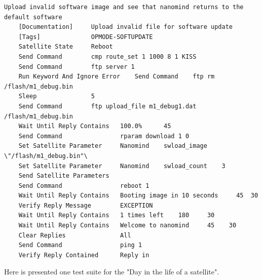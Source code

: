\documentclass[english,12pt,a4paper,pdftex,elec,utf8]{aaltothesis}
\begin{document}
\begin{verbatim}
Upload invalid software image and see that nanomind returns to the default software
	[Documentation]		Upload invalid file for software update
	[Tags]				OPMODE-SOFTUPDATE
	Satellite State 	Reboot
	Send Command 		cmp route_set 1 1000 8 1 KISS
	Send Command 		ftp server 1
	Run Keyword And Ignore Error 	Send Command    ftp rm /flash/m1_debug.bin
	Sleep 				5
	Send Command		ftp upload_file m1_debug1.dat /flash/m1_debug.bin
	Wait Until Reply Contains   100.0% 		45
	Send Command 				rparam download 1 0
	Set Satellite Parameter		Nanomind 	swload_image	\"/flash/m1_debug.bin"\
	Set Satellite Parameter		Nanomind 	swload_count	3
	Send Satellite Parameters
	Send Command 				reboot 1
	Wait Until Reply Contains 	Booting image in 10 seconds 	45 	30
	Verify Reply Message 		EXCEPTION
	Wait Until Reply Contains   1 times left 	180 	30
	Wait Until Reply Contains 	Welcome to nanomind 	45    30
	Clear Replies 				All
	Send Command 				ping 1
	Verify Reply Contained 		Reply in

\end{verbatim}
\newpage
Here is presented one test suite for the "Day in the life of a satellite".
\end{document}

